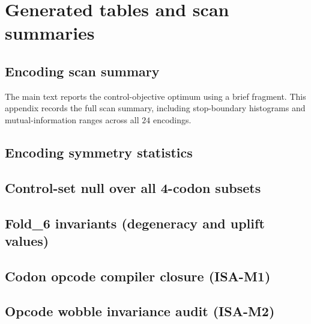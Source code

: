 \section{Generated tables and scan summaries}
\label{app:generated_tables}

\subsection{Encoding scan summary}

\noindent The main text reports the control-objective optimum using a brief fragment.
This appendix records the full scan summary, including stop-boundary histograms and mutual-information ranges across all $24$ encodings.


\medskip
\noindent

\subsection{Encoding symmetry statistics}

\noindent

\noindent

\subsection{Control-set null over all 4-codon subsets}
\label{app:control_set_null}

\noindent

\noindent

\subsection{Fold\_6 invariants (degeneracy and uplift values)}



\subsection{Codon opcode compiler closure (ISA-M1)}

\noindent

\subsection{Opcode wobble invariance audit (ISA-M2)}

